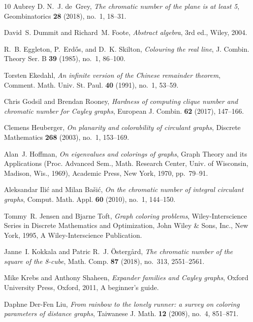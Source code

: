 \documentclass{article}
\theoremstyle{definition}
\theoremstyle{remark}
\begin{document}
\begin{thebibliography}{10}
Aubrey D. N.~J. de~Grey, \emph{The chromatic number of the plane is at least
  5}, Geombinatorics \textbf{28} (2018), no.~1, 18--31. 

David~S. Dummit and Richard~M. Foote, \emph{Abstract algebra}, 3rd ed., Wiley,
  2004.

R.~B. Eggleton, P.~Erd\H{o}s, and D.~K. Skilton, \emph{Colouring the real
  line}, J. Combin. Theory Ser. B \textbf{39} (1985), no.~1, 86--100.

Torsten Ekedahl, \emph{An infinite version of the {C}hinese remainder theorem},
  Comment. Math. Univ. St. Paul. \textbf{40} (1991), no.~1, 53--59.

Chris Godsil and Brendan Rooney, \emph{Hardness of computing clique number and
  chromatic number for {C}ayley graphs}, European J. Combin. \textbf{62}
  (2017), 147--166. 

Clemens Heuberger, \emph{On planarity and colorability of circulant graphs},
  Discrete Mathematics \textbf{268} (2003), no.~1, 153–169.

Alan~J. Hoffman, \emph{On eigenvalues and colorings of graphs}, Graph {T}heory
  and its {A}pplications ({P}roc. {A}dvanced {S}em., {M}ath. {R}esearch
  {C}enter, {U}niv. of {W}isconsin, {M}adison, {W}is., 1969), Academic Press,
  New York, 1970, pp.~79--91. 

Aleksandar Ili\'{c} and Milan Ba\v{s}i\'{c}, \emph{On the chromatic number of
  integral circulant graphs}, Comput. Math. Appl. \textbf{60} (2010), no.~1,
  144--150. 

Tommy~R. Jensen and Bjarne Toft, \emph{Graph coloring problems},
  Wiley-Interscience Series in Discrete Mathematics and Optimization, John
  Wiley \& Sons, Inc., New York, 1995, A Wiley-Interscience Publication.

Janne~I. Kokkala and Patric R.~J. \"{O}sterg\aa rd, \emph{The chromatic number
  of the square of the 8-cube}, Math. Comp. \textbf{87} (2018), no.~313,
  2551--2561. 

Mike Krebs and Anthony Shaheen, \emph{Expander families and {C}ayley graphs},
  Oxford University Press, Oxford, 2011, A beginner's guide. 

Daphne Der-Fen Liu, \emph{From rainbow to the lonely runner: a survey on
  coloring parameters of distance graphs}, Taiwanese J. Math. \textbf{12}
  (2008), no.~4, 851--871. 


\end{thebibliography}
\end{document}
